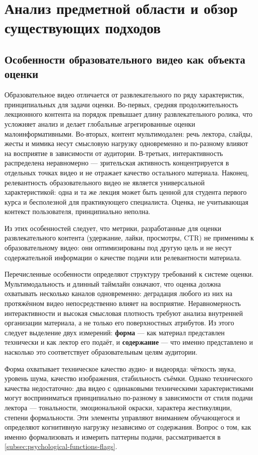 \section{Анализ предметной области и обзор существующих подходов}


\subsection{Особенности образовательного видео как объекта оценки}


Образовательное видео отличается от развлекательного по ряду характеристик, принципиальных для задачи оценки.
Во-первых, средняя продолжительность лекционного контента на порядок превышает длину развлекательного ролика,
что усложняет анализ и делает глобальные агрегированные оценки малоинформативными.
Во-вторых, контент мультимодален: речь лектора, слайды, жесты и мимика несут смысловую нагрузку одновременно и по-разному влияют на восприятие в зависимости от аудитории.
В-третьих, интерактивность распределена неравномерно — зрительская активность концентрируется в отдельных точках видео и не отражает качество остального материала.
Наконец, релевантность образовательного видео не является универсальной характеристикой: одна и та же лекция может быть ценной для студента первого курса
и бесполезной для практикующего специалиста. Оценка, не учитывающая контекст пользователя, принципиально неполна.

Из этих особенностей следует, что метрики, разработанные для оценки развлекательного контента (удержание, лайки, просмотры,
CTR) не применимы к образовательному видео: они оптимизированы под другую цель и не несут содержательной информации о качестве подачи или релевантности материала.

Перечисленные особенности определяют структуру требований к системе оценки. Мультимодальность и длинный таймлайн означают,
что оценка должна охватывать несколько каналов одновременно: деградация любого из них на протяжённом видео непосредственно влияет на восприятие.
Неравномерность интерактивности и высокая смысловая плотность требуют анализа внутренней организации материала, а не только его поверхностных атрибутов.
Из этого следует выделение двух измерений: \textbf{форма} — как материал представлен технически и как лектор его подаёт, и \textbf{содержание} — что именно представлено
и насколько это соответствует образовательным целям аудитории.

Форма охватывает техническое качество аудио- и видеоряда: чёткость звука, уровень шума, качество изображения, стабильность съёмки.
Однако технического качества недостаточно: два видео с одинаковыми техническими характеристиками могут восприниматься принципиально по-разному
в зависимости от стиля подачи лектора — тональности, эмоциональной окраски, характера жестикуляции, степени формальности.
Эти элементы управляют вниманием обучающегося и определяют когнитивную нагрузку независимо от содержания.
Вопрос о том, как именно формализовать и измерить паттерны подачи, рассматривается в \cref{subsec:psychological-functions-flags}.


